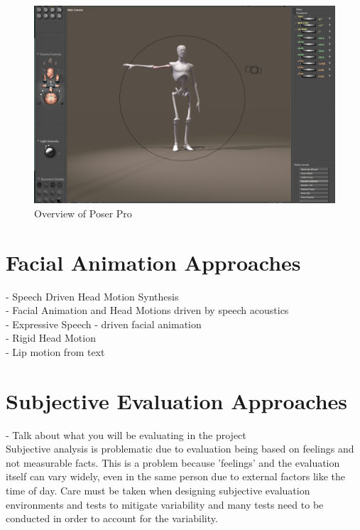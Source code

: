 \documentclass[bsc,frontabs,twoside,singlespacing,parskip]{infthesis}
\begin{document}
\begin{figure}
	\centering
		\includegraphics[width=1.0\textwidth]{poser.png}
		\caption{Overview of Poser Pro}
\end{figure}

\section{Facial Animation Approaches}

- Speech Driven Head Motion Synthesis \cite{speech_driven_head_motion} \\
- Facial Animation and Head Motions driven by speech acoustics \cite{facial_animation_acoustics} \\
- Expressive Speech - driven facial animation \cite{expressive_speech_animation} \\
- Rigid Head Motion \cite{rigid_head_motion} \\
- Lip motion from text \cite{lip_motion} \\

\section{Subjective Evaluation Approaches}
- Talk about what you will be evaluating in the project \\

Subjective analysis is problematic due to evaluation being based on feelings and not measurable facts. This is a problem because 'feelings' and the evaluation itself can vary widely, even in the same person due to external factors like the time of day. Care must be taken when designing subjective evaluation environments and tests to mitigate variability and many tests need to be conducted in order to account for the variability. 
\end{document}

